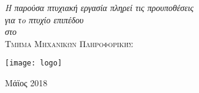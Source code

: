 \begin{titlepage}
\vfill

\large \textit{Η παρούσα πτυχιακή εργασία πληρεί τις προυποθέσεις\\ για τo πτυχίο επιπέδου 
 }\\[0.3cm] %
\textit{στο}\\[0.4cm]
\textsc{\large \color{maroon}Τμήμα Μηχανικών Πληροφορικής}\\[0.5cm] %
\vfill



\texttt{[image: logo]}\\
\vfill
 

{\large Μάϊος 2018}\\[2cm]

\vfill 

\end{titlepage}